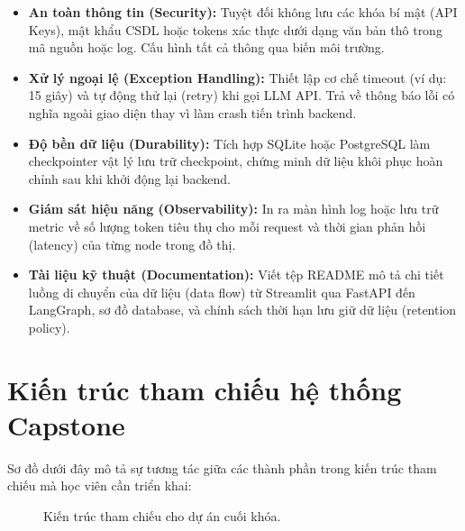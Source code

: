 \begin{itemize}
  \item \textbf{An toàn thông tin (Security):} Tuyệt đối không lưu các khóa bí mật (API Keys), mật khẩu CSDL hoặc tokens xác thực dưới dạng văn bản thô trong mã nguồn hoặc log. Cấu hình tất cả thông qua biến môi trường.
  \item \textbf{Xử lý ngoại lệ (Exception Handling):} Thiết lập cơ chế timeout (ví dụ: 15 giây) và tự động thử lại (retry) khi gọi LLM API. Trả về thông báo lỗi có nghĩa ngoài giao diện thay vì làm crash tiến trình backend.
  \item \textbf{Độ bền dữ liệu (Durability):} Tích hợp SQLite hoặc PostgreSQL làm checkpointer vật lý lưu trữ checkpoint, chứng minh dữ liệu khôi phục hoàn chỉnh sau khi khởi động lại backend.
  \item \textbf{Giám sát hiệu năng (Observability):} In ra màn hình log hoặc lưu trữ metric về số lượng token tiêu thụ cho mỗi request và thời gian phản hồi (latency) của từng node trong đồ thị.
  \item \textbf{Tài liệu kỹ thuật (Documentation):} Viết tệp README mô tả chi tiết luồng di chuyển của dữ liệu (data flow) từ Streamlit qua FastAPI đến LangGraph, sơ đồ database, và chính sách thời hạn lưu giữ dữ liệu (retention policy).
\end{itemize}

\section{Kiến trúc tham chiếu hệ thống Capstone}

Sơ đồ dưới đây mô tả sự tương tác giữa các thành phần trong kiến trúc tham chiếu mà học viên cần triển khai:

\begin{figure}[H]
\centering
{}
\caption{Kiến trúc tham chiếu cho dự án cuối khóa.}
\label{fig:capstone-architecture}
\end{figure}

